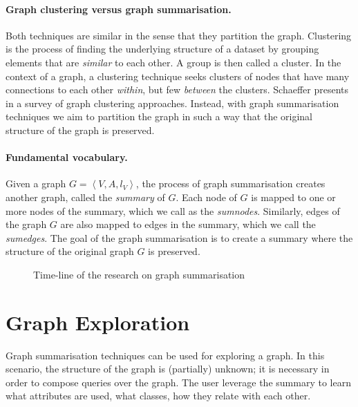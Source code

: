 \paragraph{Graph clustering versus graph summarisation.}

Both techniques are similar in the sense that they partition the graph.
Clustering is the process of finding the underlying structure of a dataset by grouping elements that are \emph{similar} to each other. A group is then called a cluster. In the context of a graph, a clustering technique seeks clusters of nodes that have many connections to each other \emph{within}, but few \emph{between} the clusters. Schaeffer presents in \cite{schaeffer:2007:graph} a survey of graph clustering approaches. Instead, with graph summarisation techniques we aim to partition the graph in such a way that the original structure of the graph is preserved.

\paragraph{Fundamental vocabulary.}

Given a graph $G = \left\langle V, A, l_V \right\rangle$, the process of graph summarisation creates another graph, called the \emph{summary} of $G$. Each node of $G$ is mapped to one or more nodes of the summary, which we call as the \emph{sumnodes}. Similarly, edges of the graph $G$ are also mapped to edges in the summary, which we call the \emph{sumedges}. The goal of the graph summarisation is to create a summary where the structure of the original graph $G$ is preserved.

\begin{figure}
	\resizebox{\textwidth}{!}{
		
	}
	\caption{Time-line of the research on graph summarisation}
	\label{fig:timeline}
\end{figure}

\section{Graph Exploration}
\label{chap03:review:graph-exploration}

Graph summarisation techniques can be used for exploring a graph. In this scenario, the structure of the graph is (partially) unknown; it is necessary in order to compose queries over the graph. The user leverage the summary to learn what attributes are used, what classes, how they relate with each other.\\


